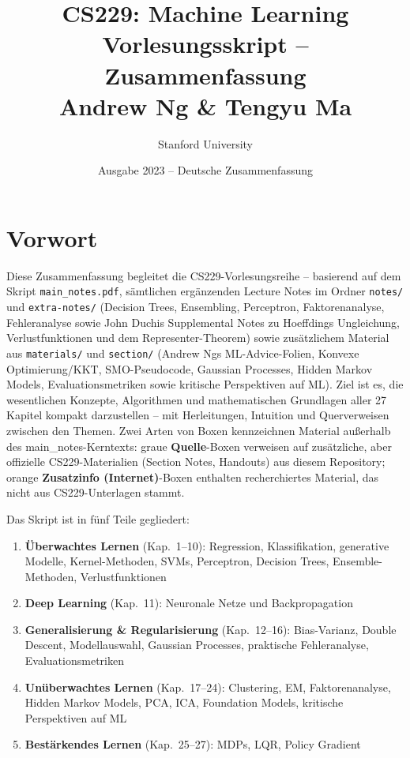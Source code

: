 \documentclass[11pt]{article}
\title{%
  \vspace{-1cm}
  {\Large CS229: Machine Learning}\\[6pt]
  {\LARGE\bfseries\color{mainblue} Vorlesungsskript -- Zusammenfassung}\\[6pt]
  {\large Andrew Ng \& Tengyu Ma}
}
\author{Stanford University}
\date{Ausgabe 2023 -- Deutsche Zusammenfassung}
\theoremstyle{csthm}
\theoremstyle{csdef}
\begin{document}
\maketitle
\tableofcontents
\newpage

\section*{Vorwort}

Diese Zusammenfassung begleitet die CS229-Vorlesungsreihe -- basierend auf
dem Skript \texttt{main\_notes.pdf}, sämtlichen ergänzenden Lecture Notes im
Ordner \texttt{notes/} und \texttt{extra-notes/} (Decision Trees, Ensembling,
Perceptron, Faktorenanalyse, Fehleranalyse sowie John Duchis Supplemental
Notes zu Hoeffdings Ungleichung, Verlustfunktionen und dem
Representer-Theorem) sowie zusätzlichem Material aus \texttt{materials/} und
\texttt{section/} (Andrew Ngs ML-Advice-Folien, Konvexe Optimierung/KKT,
SMO-Pseudocode, Gaussian Processes, Hidden Markov Models, Evaluationsmetriken
sowie kritische Perspektiven auf ML). Ziel ist es, die wesentlichen Konzepte,
Algorithmen und mathematischen Grundlagen aller 27 Kapitel kompakt
darzustellen -- mit Herleitungen, Intuition und Querverweisen zwischen den
Themen. Zwei Arten von Boxen kennzeichnen Material außerhalb des
main\_notes-Kerntexts: graue \textbf{Quelle}-Boxen verweisen auf zusätzliche,
aber offizielle CS229-Materialien (Section Notes, Handouts) aus diesem
Repository; orange \textbf{Zusatzinfo (Internet)}-Boxen enthalten recherchiertes
Material, das nicht aus CS229-Unterlagen stammt.

Das Skript ist in fünf Teile gegliedert:
\begin{enumerate}
  \item \textbf{Überwachtes Lernen} (Kap.~1--10): Regression, Klassifikation,
        generative Modelle, Kernel-Methoden, SVMs, Perceptron, Decision
        Trees, Ensemble-Methoden, Verlustfunktionen
  \item \textbf{Deep Learning} (Kap.~11): Neuronale Netze und Backpropagation
  \item \textbf{Generalisierung \& Regularisierung} (Kap.~12--16):
        Bias-Varianz, Double Descent, Modellauswahl, Gaussian Processes,
        praktische Fehleranalyse, Evaluationsmetriken
  \item \textbf{Unüberwachtes Lernen} (Kap.~17--24): Clustering, EM,
        Faktorenanalyse, Hidden Markov Models, PCA, ICA, Foundation Models,
        kritische Perspektiven auf ML
  \item \textbf{Bestärkendes Lernen} (Kap.~25--27): MDPs, LQR, Policy
        Gradient
\end{enumerate}
\end{document}
